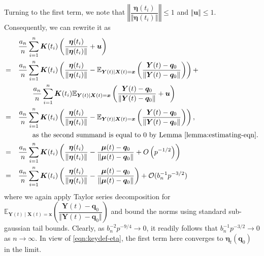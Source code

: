 \documentclass[aos]{imsart}
\theoremstyle{plain}
\theoremstyle{remark}
\def\E{\mathbb{E}}
\newcommand{\bb}[1]{\boldsymbol{#1}}
\begin{document}
Turning to the first term, we note that $\left\Vert \dfrac{\bb{\eta}(t_i)}{\Vert \bb{\eta}(t_i)\Vert} \right\Vert \leq 1$ and $\Vert \bb{u} \Vert \leq 1$. Consequently, we can rewrite it as
\begin{align*}
    & \quad \dfrac{a_n}{n}\sum_{i=1}^n \bb{K}(t_i) \left(\dfrac{\bb{\eta}(t_i)}{\Vert \bb{\eta}(t_i)\Vert} + \bb{u} \right)\\
    = & \quad \dfrac{a_n}{n}\sum_{i=1}^n \bb{K}(t_i) \left( \dfrac{\bb{\eta}(t_i)}{\Vert \bb{\eta}(t_i)\Vert} - \E_{\bb{Y}(t) \mid \bb{X}(t) = \bb{x}}\left( \dfrac{\bb{Y}(t) - \bb{q}_0}{\Vert \bb{Y}(t) - \bb{q}_0 \Vert} \right) \right) + \\
    & \quad \quad \quad \dfrac{a_n}{n}\sum_{i=1}^n \bb{K}(t_i) \E_{\bb{Y}(t) \mid \bb{X}(t) = \bb{x}}\left( \dfrac{\bb{Y}(t) - \bb{q}_0}{\Vert \bb{Y}(t) - \bb{q}_0 \Vert} + \bb{u} \right)\\
    = & \quad \dfrac{a_n}{n}\sum_{i=1}^n \bb{K}(t_i) \left( \dfrac{\bb{\eta}(t_i)}{\Vert \bb{\eta}(t_i)\Vert} - \E_{\bb{Y}(t) \mid \bb{X}(t) = \bb{x}}\left( \dfrac{\bb{Y}(t) - \bb{q}_0}{\Vert \bb{Y}(t) - \bb{q}_0 \Vert} \right) \right), \\
    & \quad \quad \quad \text{as the second summand is equal to $0$ by Lemma~\ref{lemma:estimating-eqn}.}\\
    = & \quad \dfrac{a_n}{n}\sum_{i=1}^n \bb{K}(t_i) \left( \dfrac{\bb{\eta}(t_i)}{\Vert \bb{\eta}(t_i)\Vert} - \dfrac{\bb{\mu}(t) - \bb{q}_0}{\Vert \bb{\mu}(t) - \bb{q}_0 \Vert} + O\left( p^{-1/2} \right) \right)\\
    = & \quad \dfrac{a_n}{n}\sum_{i=1}^n \bb{K}(t_i) \left( \dfrac{\bb{\eta}(t_i)}{\Vert \bb{\eta}(t_i)\Vert} - \dfrac{\bb{\mu}(t) - \bb{q}_0}{\Vert \bb{\mu}(t) - \bb{q}_0 \Vert} \right) + \mathcal{O}(b_n^{-1}p^{-3/2})
\end{align*}
\noindent where we again apply Taylor series decomposition for $\E_{\bb{Y}(t) \mid \bb{X}(t) = \bb{x}}\left( \dfrac{\bb{Y}(t) - \bb{q}_0}{\Vert \bb{Y}(t) - \bb{q}_0 \Vert} \right)$ and bound the norms using standard sub-gaussian tail bounds. Clearly, as $b_n^{-2}p^{-9/4} \rightarrow 0$, it readily follows that $b_n^{-1}p^{-3/2} \rightarrow 0$ as $n \rightarrow \infty$. In view of \eqref{eqn:keydef-eta}, the first term here converges to $\bb{\eta}_t(\bb{q}_0)$ in the limit. 
\end{document}
